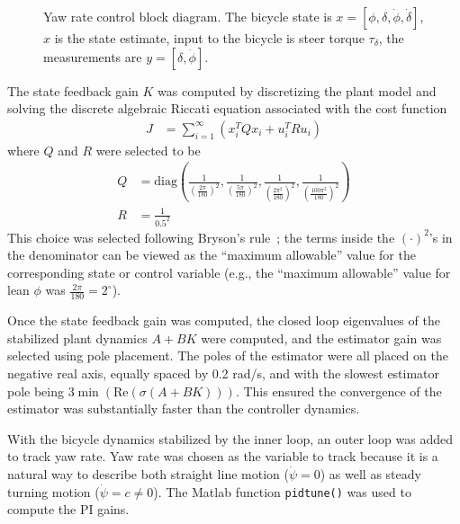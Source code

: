 \begin{figure}[htbp]
  \caption[Yaw rate control block diagram.]{Yaw rate control block diagram. The
    bicycle state is $x=[\phi, \delta, \dot{\phi}, \dot{\delta}]$, $\hat{x}$ is
    the state estimate, input to the bicycle is steer torque $\tau_\delta$, the
    measurements are $y = [\delta, \dot{\phi}]$.}
  \label{rb:fig:yr_block_diagram}
\end{figure}
The state feedback gain $K$ was computed by discretizing the plant model and
solving the discrete algebraic Riccati equation associated with the cost
function
\begin{align}
  J &= \sum_{i=1}^{\infty} (x_i^T Q x_i + u_i^T R u_i)
\end{align}
where $Q$ and $R$ were selected to be
\begin{align}
  Q &= \text{diag}(\frac{1}{(\frac{2\pi}{180})^{2}},
                   \frac{1}{(\frac{5\pi}{180})^{2}},
                   \frac{1}{(\frac{2\pi^2}{180})^{2}},
                   \frac{1}{(\frac{100\pi^2}{180})^{2}}) \\
  R &= \frac{1}{0.5^2}
\end{align}
This choice was selected following Bryson's rule~\cite{Bryson1975}; the terms
inside the $(\cdot)^2$'s in the denominator can be viewed as the ``maximum
allowable'' value for the corresponding state or control variable (e.g., the
``maximum allowable'' value for lean $\phi$ was $\frac{2\pi}{180}=2^{\circ}$).

Once the state feedback gain was computed, the closed loop eigenvalues of the
stabilized plant dynamics $A+BK$ were computed, and the estimator gain was
selected using pole placement. The poles of the estimator were all placed on
the negative real axis, equally spaced by 0.2 rad/s, and with the slowest estimator
pole being $3\min(\text{Re}(\sigma(A+BK)))$. This ensured the convergence of
the estimator was substantially faster than the controller dynamics.

With the bicycle dynamics stabilized by the inner loop, an outer loop was added
to track yaw rate. Yaw rate was chosen as the variable to track because it is a
natural way to describe both straight line motion ($\dot{\psi}=0$) as well as
steady turning motion ($\dot{\psi}=c\ne0$). The Matlab function
\verb|pidtune()| was used to compute the PI gains.

